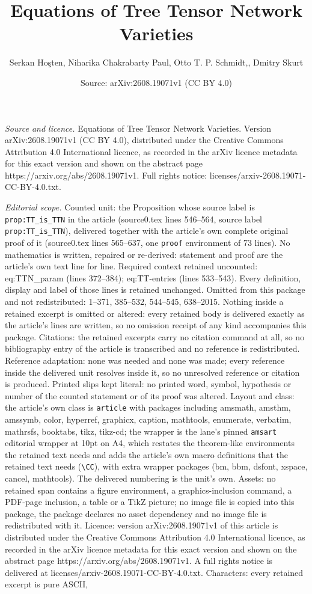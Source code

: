 \documentclass[10pt,a4paper]{amsart}
\title[Equations of Tree Tensor Network Varieties]{Equations of Tree Tensor Network Varieties}
\author{Serkan Ho\c{s}ten, Niharika Chakrabarty Paul, Otto T. P. Schmidt,, Dmitry Skurt}
\date{Source: arXiv:2608.19071v1 (CC BY 4.0)}
\begin{document}
\maketitle

\noindent\emph{Source and licence.} Equations of Tree Tensor Network Varieties. Version arXiv:2608.19071v1 (CC BY 4.0), distributed under the Creative Commons Attribution 4.0 International licence, as recorded in the arXiv licence metadata for this exact version and shown on the abstract page https://arxiv.org/abs/2608.19071v1. Full rights notice: licenses/arxiv-2608.19071-CC-BY-4.0.txt.\par\smallskip

\noindent\textit{Editorial scope.} Counted unit: the Proposition whose source label is \texttt{prop:TT\_is\_TTN} in the article (source0.tex lines 546--564, source label \texttt{prop:TT\_is\_TTN}), delivered together with the article's own complete original proof of it (source0.tex lines 565--637, one \texttt{proof} environment of 73 lines). No mathematics is written, repaired or re-derived: statement and proof are the article's own text line for line. Required context retained uncounted: eq:TTN\_param (lines 372--384); eq:TT-entries (lines 533--543). Every definition, display and label of those lines is retained unchanged. Omitted from this package and not redistributed: 1--371, 385--532, 544--545, 638--2015. Nothing inside a retained excerpt is omitted or altered: every retained body is delivered exactly as the article's lines are written, so no omission receipt of any kind accompanies this package. Citations: the retained excerpts carry no citation command at all, so no bibliography entry of the article is transcribed and no reference is redistributed. Reference adaptation: none was needed and none was made; every reference inside the delivered unit resolves inside it, so no unresolved reference or citation is produced. Printed slips kept literal: no printed word, symbol, hypothesis or number of the counted statement or of its proof was altered. Layout and class: the article's own class is \texttt{article} with packages including amsmath, amsthm, amssymb, color, hyperref, graphicx, caption, mathtools, enumerate, verbatim, mathrsfs, booktabs, tikz, tikz-cd; the wrapper is the lane's pinned \texttt{amsart} editorial wrapper at 10pt on A4, which restates the theorem-like environments the retained text needs and adds the article's own macro definitions that the retained text needs (\texttt{\textbackslash CC}), with extra wrapper packages (bm, bbm, dsfont, xspace, cancel, mathtools). The delivered numbering is the unit's own. Assets: no retained span contains a figure environment, a graphics-inclusion command, a PDF-page inclusion, a table or a TikZ picture; no image file is copied into this package, the package declares no asset dependency and no image file is redistributed with it. Licence: version arXiv:2608.19071v1 of this article is distributed under the Creative Commons Attribution 4.0 International licence, as recorded in the arXiv licence metadata for this exact version and shown on the abstract page https://arxiv.org/abs/2608.19071v1. A full rights notice is delivered at licenses/arxiv-2608.19071-CC-BY-4.0.txt. Characters: every retained excerpt is pure ASCII, 
\end{document}
